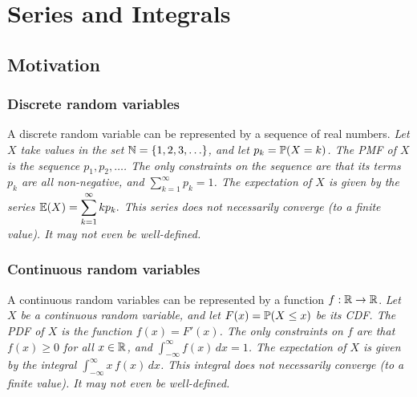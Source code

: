 \chapter{Series and Integrals}\label{chap:seriesandintegrals}
\section{Motivation}

%


\subsection*{Discrete random variables}
A discrete random variable can be represented by a sequence of real numbers. 
\bit
\it Let $X$ take values in the set $\mathbb{N} = \{1,2,3,\ldots\}$, and let $p_k = \mathbb{P}(X=k)$.
\it The PMF of $X$ is the sequence $p_1,p_2,\ldots$.
\it The only constraints on the sequence are that its terms $p_k$ are all non-negative, and $\displaystyle\sum_{k=1}^{\infty} p_k = 1$.
\it The expectation of $X$ is given by the series $\mathbb{E}(X)=\displaystyle\sum_{k=1}^{\infty} k p_k.$
	\bit
	\it This series does not necessarily converge (to a finite value).
	\it It may not even be well-defined.
	\eit
\eit

\subsection*{Continuous random variables}
A continuous random variables can be represented by a function $f:\mathbb{R}\to\mathbb{R}$. 
\bit
\it Let $X$ be a continuous random variable, and let $F(x) = \mathbb{P}(X\leq x)$ be its CDF.
\it The PDF of $X$ is the function $f(x) = F'(x)$.
\it The only constraints on $f$ are that $f(x)\geq 0$ for all $x\in\mathbb{R}$, and $\displaystyle\int_{-\infty}^{\infty} f(x)\,dx = 1$.
\it The expectation of $X$ is given by the integral $\displaystyle\int_{-\infty}^{\infty} x\,f(x)\,dx$.
	\bit
	\it This integral does not necessarily converge (to a finite value).
	\it It may not even be well-defined.
	\eit
\eit


